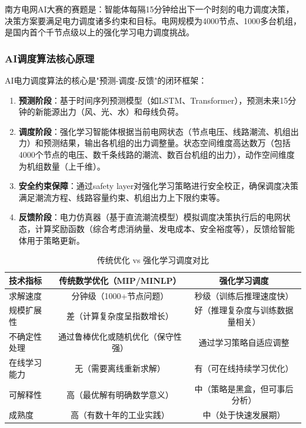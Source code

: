 南方电网AI大赛的赛题是：智能体每隔15分钟给出下一个时刻的电力调度决策，决策方案要满足电力调度诸多约束和目标。电网规模为4000节点、1000多台机组，是国内首个千节点级以上的强化学习电力调度挑战。

\subsubsection{AI调度算法核心原理}

AI电力调度算法的核心是"预测-调度-反馈"的闭环框架：

\begin{enumerate}
    \item \textbf{预测阶段}：基于时间序列预测模型（如LSTM、Transformer），预测未来15分钟的新能源出力（风、光、水）和母线负荷。

    \item \textbf{调度阶段}：强化学习智能体根据当前电网状态（节点电压、线路潮流、机组出力）和预测结果，输出各机组的出力调整量。状态空间维度高达数万（包括4000个节点的电压、数千条线路的潮流、数百台机组的出力），动作空间维度为机组数量（上千维）。

    \item \textbf{安全约束保障}：通过safety layer对强化学习策略进行安全校正，确保调度决策满足潮流方程、线路容量约束、机组出力上下限约束等。

    \item \textbf{反馈阶段}：电力仿真器（基于直流潮流模型）模拟调度决策执行后的电网状态，计算奖励函数（综合考虑消纳量、发电成本、安全裕度等），反馈给智能体用于策略更新。
\end{enumerate}

\begin{table}[htbp]
\centering
\caption{传统优化 vs 强化学习调度对比}
\begin{tabular}{lcc}
\toprule
\textbf{技术指标} & \textbf{传统数学优化（MIP/MINLP）} & \textbf{强化学习调度} \\
\midrule
求解速度 & 分钟级（1000+节点问题） & 秒级（训练后推理速度快） \\
规模扩展性 & 差（计算复杂度呈指数增长） & 好（推理复杂度与训练数据量相关） \\
不确定性处理 & 通过鲁棒优化或随机优化（保守性强） & 通过学习策略自适应调整 \\
在线学习能力 & 无（需要离线重新求解） & 有（可在线持续学习优化） \\
可解释性 & 高（最优解有明确数学意义） & 中（策略是黑盒，但可事后分析） \\
成熟度 & 高（有数十年的工业实践） & 中（处于快速发展期） \\
\bottomrule
\end{tabular}
\label{tab:optimization-vs-rl}
\end{table}

